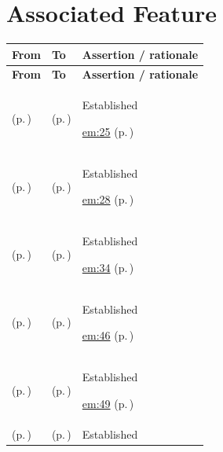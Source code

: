 \section{Associated Feature}
\begingroup\small\setlength{\TableWidth}{\dimexpr\linewidth-6\tabcolsep-4\arrayrulewidth\relax}
\begin{longtable}{|>{\raggedright\arraybackslash}p{0.27\TableWidth}|>{\raggedright\arraybackslash}p{0.27\TableWidth}|>{\raggedright\arraybackslash}p{0.46\TableWidth}|}
\hline\rowcolor{TableHead}\textbf{From} & \textbf{To} & \textbf{Assertion / rationale}\\\hline\endfirsthead
\hline\rowcolor{TableHead}\textbf{From} & \textbf{To} & \textbf{Assertion / rationale}\\\hline\endhead
\hline\endfoot
\nameref{service:person-identifier-resolution} (p.\,\pageref{service:person-identifier-resolution}) & \nameref{feature:feat-em-01} (p.\,\pageref{feature:feat-em-01}) & Established

 \hyperref[rad:em:16]{em:25} (p.\,\pageref{rad:em:16})\\\hline
\nameref{service:person-identifier-correlation} (p.\,\pageref{service:person-identifier-correlation}) & \nameref{feature:feat-em-02} (p.\,\pageref{feature:feat-em-02}) & Established

 \hyperref[rad:em:16]{em:28} (p.\,\pageref{rad:em:16})\\\hline
\nameref{service:person-identity-correction} (p.\,\pageref{service:person-identity-correction}) & \nameref{feature:feat-em-04} (p.\,\pageref{feature:feat-em-04}) & Established

 \hyperref[rad:em:16]{em:34} (p.\,\pageref{rad:em:16})\\\hline
\nameref{service:healthcare-subject-context-resolution} (p.\,\pageref{service:healthcare-subject-context-resolution}) & \nameref{feature:feat-em-05} (p.\,\pageref{feature:feat-em-05}) & Established

 \hyperref[rad:em:41]{em:46} (p.\,\pageref{rad:em:41})\\\hline
\nameref{service:demographic-change-distribution} (p.\,\pageref{service:demographic-change-distribution}) & \nameref{feature:feat-em-06} (p.\,\pageref{feature:feat-em-06}) & Established

 \hyperref[rad:em:41]{em:49} (p.\,\pageref{rad:em:41})\\\hline
\nameref{service:client-relationship-query} (p.\,\pageref{service:client-relationship-query}) & \nameref{feature:feat-em-07} (p.\,\pageref{feature:feat-em-07}) & Established


\end{longtable}
